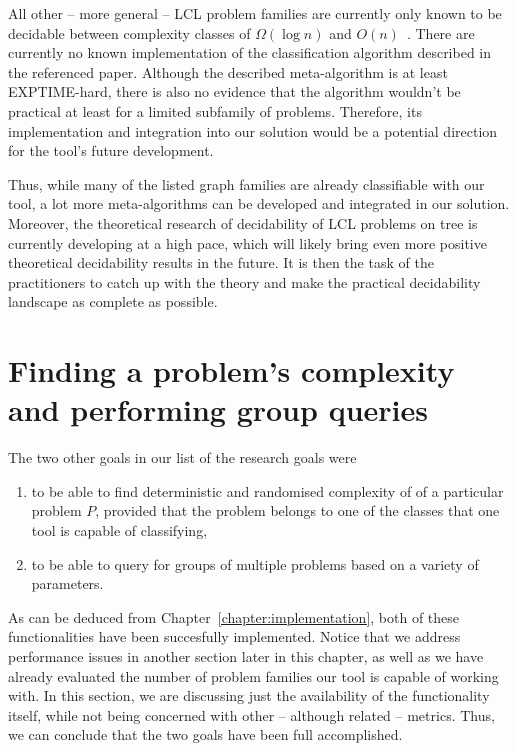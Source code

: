 All other -- more general -- LCL problem families
are currently only known to be decidable between complexity classes of
$\Omega(\log n)$ and $O(n)$~\cite{Chang2020a}. There are currently
no known implementation of the classification algorithm described in the
referenced paper. Although the described meta-algorithm is at least
EXPTIME-hard, there is also no evidence that the algorithm wouldn't be
practical at least for a limited subfamily of problems. Therefore, its
implementation and integration into our solution would be a potential
direction for the tool's future development.

Thus, while many of the listed graph families are already classifiable
with our tool, a lot more meta-algorithms can be developed
and integrated in our solution. Moreover, the theoretical
research of decidability of LCL problems on tree is currently
developing at a high pace, which will likely bring even more
positive theoretical decidability results in the future.
It is then the task of the practitioners to catch up with
the theory and make the practical decidability landscape
as complete as possible.

\section{Finding a problem's complexity and performing group queries}

The two other goals in our list of the research goals were

\begin{enumerate}
  \item to be able to find deterministic and randomised complexity of
  of a particular problem $P$, provided that the problem belongs to
  one of the classes that one tool is capable of classifying,
  \item to be able to query for groups of multiple problems based
  on a variety of parameters.
\end{enumerate}

As can be deduced from Chapter~\ref{chapter:implementation},
both of these functionalities have been succesfully implemented.
Notice that we address performance issues in another section later in
this chapter, as well as we have already evaluated the number of
problem families our tool is capable of working with. In this section,
we are discussing just the availability of the functionality itself, while not
being concerned with other -- although related -- metrics.
Thus, we can conclude that the two goals have been full accomplished.

